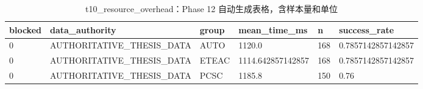 \begin{table}[htbp]
\centering
\caption{t10_resource_overhead：Phase 12 自动生成表格，含样本量和单位}
\begin{tabular}{llllll}
\hline
blocked & data_authority & group & mean_time_ms & n & success_rate \\
\hline
0 & AUTHORITATIVE\_THESIS\_DATA & AUTO & 1120.0 & 168 & 0.7857142857142857 \\
0 & AUTHORITATIVE\_THESIS\_DATA & ETEAC & 1114.642857142857 & 168 & 0.7857142857142857 \\
0 & AUTHORITATIVE\_THESIS\_DATA & PCSC & 1185.8 & 150 & 0.76 \\
\hline
\end{tabular}
\end{table}
